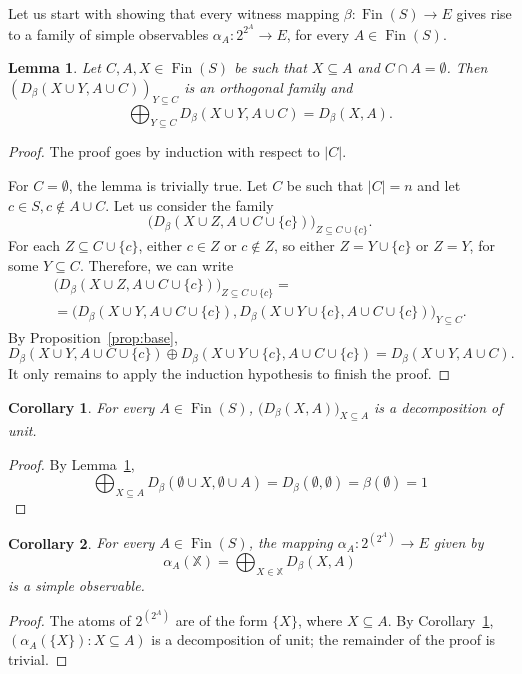 \documentclass[letterpaper]{amsart}
\newtheorem{lemma}{Lemma}
\newtheorem{corollary}{Corollary}
\theoremstyle{definition}
\DeclareMathOperator*\Fin{Fin}
\begin{document}
Let us start with showing that every witness mapping $\beta:\Fin(S)\to E$ 
gives rise to a family of simple observables $\alpha_A:2^{2^A}\to E$, for every $A\in\Fin(S)$.

\begin{lemma}
\label{lemma:second}
Let $C,A,X\in\Fin(S)$ be such that $X\subseteq A$ and 
$C\cap A=\emptyset$.
Then $(D_\beta(X\cup Y,A\cup C))_{Y\subseteq C}$ is an orthogonal
family and
$$
\bigoplus_{Y\subseteq C}D_\beta(X\cup Y,A\cup C)=D_\beta(X,A).
$$
\end{lemma}
\begin{proof}
The proof goes by induction with respect to $|C|$.

For $C=\emptyset$, the lemma is trivially true.
Let $C$ be such that $|C|=n$ and let $c\in S,c\not\in A\cup C$.
Let us consider the family
$$
\bigl(D_\beta(X\cup Z,A\cup C\cup\{c\})\bigr)_{Z\subseteq C\cup\{c\}}.
$$
For each $Z\subseteq C\cup\{c\}$, either $c\in Z$ or
$c\not\in Z$, so either $Z=Y\cup\{c\}$ or $Z=Y$, for some
$Y\subseteq C$. Therefore, we can write
\begin{align*}
\bigl(D_\beta(X\cup Z,A\cup C\cup\{c\})\bigr)_{Z\subseteq C\cup\{c\}}=\\
=\bigl(D_\beta(X\cup Y,A\cup C\cup\{c\}),
	D_\beta(X\cup Y\cup\{c\},A\cup C\cup\{c\})\bigr)_{Y\subseteq C}.
\end{align*}
By Proposition~\ref{prop:base},
$$
D_\beta(X\cup Y,A\cup C\cup\{c\})\oplus
	D_\beta(X\cup Y\cup\{c\},A\cup C\cup\{c\})=
D_\beta(X\cup Y,A\cup C).
$$
It only 
remains to apply the induction hypothesis to finish the proof.
\end{proof}
\begin{corollary}
\label{coro:decomposition}
For every $A\in\Fin(S)$, $\bigl(D_\beta(X,A)\bigr)_{X\subseteq A}$ is a
decomposition of unit.
\end{corollary}
\begin{proof}
By Lemma~\ref{lemma:second},
$$
\bigoplus_{X\subseteq A}D_\beta(\emptyset\cup X,\emptyset\cup A)
=D_\beta(\emptyset,\emptyset)=\beta(\emptyset)=1
$$
\end{proof}
\begin{corollary}
\label{coro:betaAobservable}
For every $A\in\Fin(S)$, the mapping
$\alpha_A:2^{(2^A)}\to E$ given by
$$
\alpha_A(\mathbb X)=\bigoplus_{X\in\mathbb X}D_\beta(X,A)
$$
is a simple observable.
\end{corollary}
\begin{proof}
The atoms of $2^{(2^A)}$ are of the form $\{X\}$, where
$X\subseteq A$.
By Corollary~\ref{coro:decomposition},
$(\alpha_A(\{X\}):X\subseteq A)$ is a decomposition of unit;
the remainder of the proof is trivial.
\end{proof}
\end{document}
